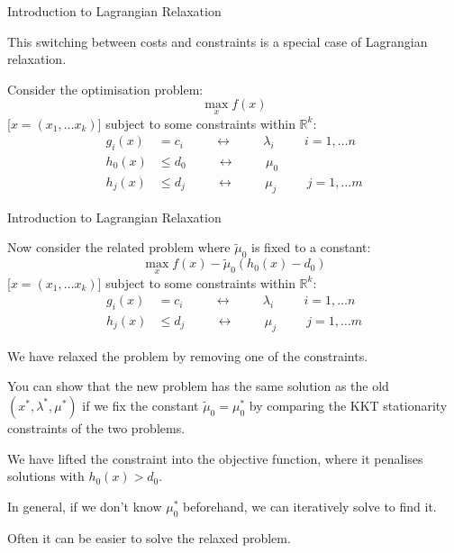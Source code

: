 \documentclass[10pt,aspectratio=169,dvipsnames]{beamer}
\newcommand{\R}{\mathbb{R}}
\def\l{\lambda}
\def\m{\mu}
\begin{document}
\begin{frame}{Introduction to Lagrangian Relaxation}

  This switching between costs and constraints is a special case of \alert{Lagrangian relaxation}.

  Consider the optimisation problem:
  \begin{equation*}
  \max_{x} f(x)
\end{equation*}
[$x = (x_1, \dots x_k)$] subject to some \alert{constraints} within $\R^k$:
\begin{align*}
  g_i(x) & = c_i \hspace{1cm}\leftrightarrow\hspace{1cm} \l_i \hspace{1cm} i = 1,\dots n \\
  h_0(x) & \leq d_0  \hspace{1cm}\leftrightarrow\hspace{1cm} \m_0 \\
  h_j(x) & \leq d_j \hspace{1cm}\leftrightarrow\hspace{1cm} \m_j \hspace{1cm} j = 1,\dots m
\end{align*}

\end{frame}



\begin{frame}{Introduction to Lagrangian Relaxation}

  Now consider the related problem where $\tilde\mu_0$ is fixed to a constant:
  \begin{equation*}
  \max_{x} f(x) - \tilde\mu_0 (h_0(x) - d_0)
\end{equation*}
[$x = (x_1, \dots x_k)$] subject to some \alert{constraints} within $\R^k$:
\begin{align*}
  g_i(x) & = c_i \hspace{1cm}\leftrightarrow\hspace{1cm} \l_i \hspace{1cm} i = 1,\dots n \\
  h_j(x) & \leq d_j \hspace{1cm}\leftrightarrow\hspace{1cm} \m_j \hspace{1cm} j = 1,\dots m
\end{align*}

We have \alert{relaxed} the problem by removing one of the constraints.

You can show that the new problem has the same solution as the old $(x^*,\l^*,\m^*)$ if we fix the constant $\tilde\mu_0 = \mu_0^*$ by comparing the KKT stationarity constraints of the two problems.

We have lifted the constraint into the objective function, where it penalises solutions with $h_0(x) > d_0$.

In general, if we don't know $\mu_0^*$ beforehand, we can iteratively solve to find it.

Often it can be easier to solve the relaxed problem.


\end{frame}
\end{document}
